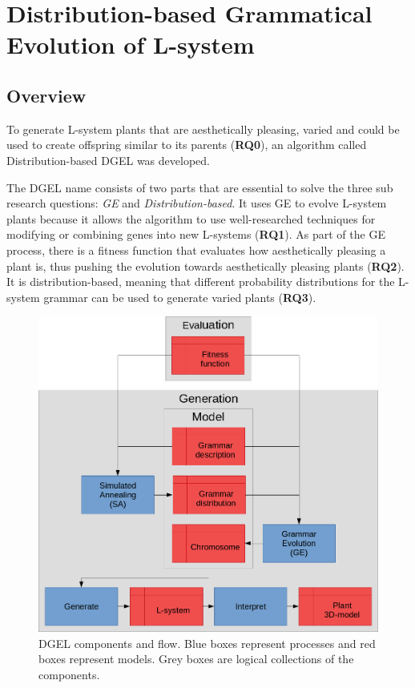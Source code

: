\chapter{Distribution-based Grammatical Evolution of L-system}
\label{chap:dgel}

\section{Overview}
\label{sec:overview}
To generate \gls{L-system} plants that are aesthetically pleasing, varied and could be used to create offspring similar to its parents (\textbf{RQ0}), an algorithm called Distribution-based \gls{DGEL} was developed.

The \gls{DGEL} name consists of two parts that are essential to solve the three sub research questions: \textit{\gls{GE}} and \textit{Distribution-based}.
It uses \gls{GE} to evolve \gls{L-system} plants because it allows the algorithm to use well-researched techniques for modifying or combining genes into new \glspl{L-system} (\textbf{RQ1}).
As part of the \gls{GE} process, there is a fitness function that evaluates how aesthetically pleasing a plant is, thus pushing the evolution towards aesthetically pleasing plants (\textbf{RQ2}).
It is distribution-based, meaning that different probability distributions for the \gls{L-system} grammar can be used to generate varied plants (\textbf{RQ3}).

\begin{figure}
    \centering
    \includegraphics[width=1.0\textwidth]{figures/dgel}
    \caption[DGEL components and flow]{\gls{DGEL} components and flow. Blue boxes represent processes and red boxes represent models. Grey boxes are logical collections of the components.}
    \label{fig:dgel}
\end{figure}

